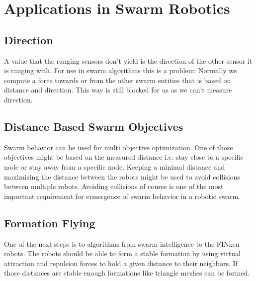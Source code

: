 \section{Applications in Swarm Robotics}

\subsection{Direction}
A value that the ranging sensors don't yield is the direction of the other sensor it is ranging with.
For use in swarm algorithms this is a problem: Normally we compute a force towards or from the other swarm entities that is based on distance and direction.
This way is still blocked for us as we can't measure direction.

\subsection{Distance Based Swarm Objectives}
Swarm behavior can be used for multi objective optimization.
One of those objectives might be based on the measured distance i.e. stay close to a specific node or stay away from a specific node.
Keeping a minimal distance and maximizing the distance between the robots might be used to avoid collisions between multiple robots.
Avoiding collisions of course is one of the most important requirement for ermergence of swarm behavior in a robotic swarm.

\subsection{Formation Flying}
One of the next steps is to  algorithms from swarm intelligence to the FINken robots.
The robots should be able to form a stable formation by using virtual attraction and repulsion forces to hold a given distance to their neighbors.
If those distances are stable enough formations like triangle meshes can be formed.

